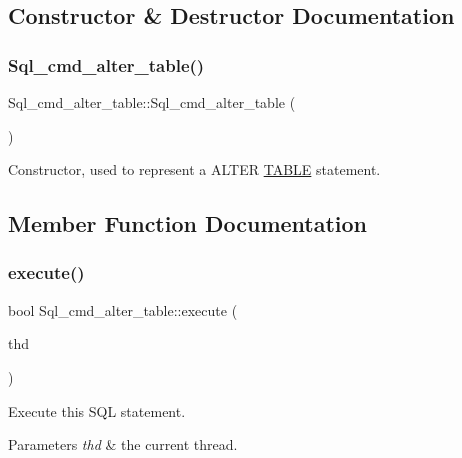 \subsection{Constructor \& Destructor Documentation}
\mbox{\label{classSql__cmd__alter__table_a9305d595481050226bddf28b1158f826}} 
\subsubsection{\texorpdfstring{Sql\+\_\+cmd\+\_\+alter\+\_\+table()}{Sql\_cmd\_alter\_table()}}
{\footnotesize\ttfamily Sql\+\_\+cmd\+\_\+alter\+\_\+table\+::\+Sql\+\_\+cmd\+\_\+alter\+\_\+table (\begin{DoxyParamCaption}{ }\end{DoxyParamCaption})\hspace{0.3cm}{\ttfamily [inline]}}

Constructor, used to represent a A\+L\+T\+ER \mbox{\hyperlink{structTABLE}{T\+A\+B\+LE}} statement. 

\subsection{Member Function Documentation}
\mbox{\label{classSql__cmd__alter__table_af5e5efa7c0d8a3a4c4122c20e86a658f}} 
\subsubsection{\texorpdfstring{execute()}{execute()}}
{\footnotesize\ttfamily bool Sql\+\_\+cmd\+\_\+alter\+\_\+table\+::execute (\begin{DoxyParamCaption}\item[{T\+HD $\ast$}]{thd }\end{DoxyParamCaption})\hspace{0.3cm}{\ttfamily [virtual]}}

Execute this S\+QL statement. 
\begin{DoxyParams}{Parameters}
{\em thd} & the current thread. \\
\hline
\end{DoxyParams}

